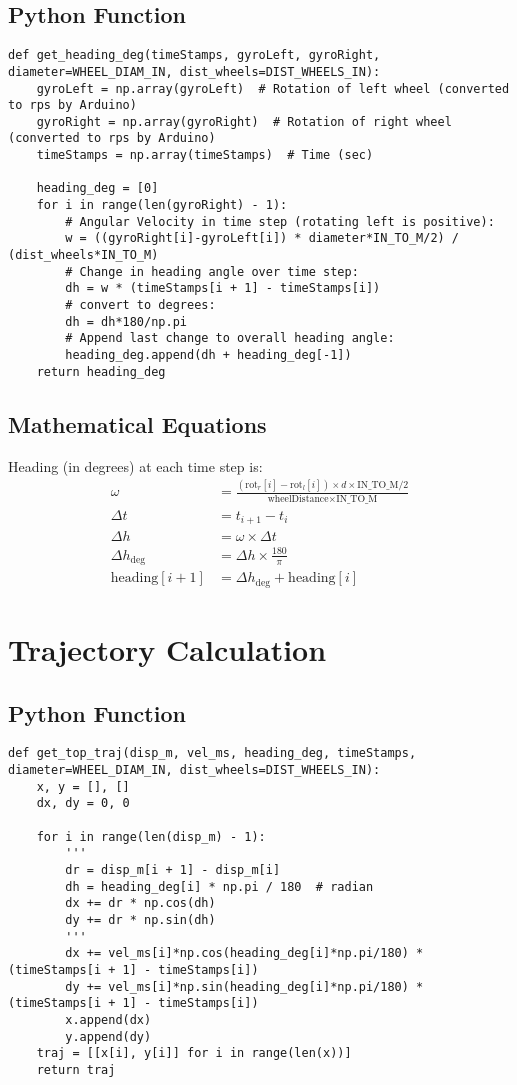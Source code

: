 \documentclass{article}
\begin{document}
\subsection{Python Function}
\begin{lstlisting}
def get_heading_deg(timeStamps, gyroLeft, gyroRight, diameter=WHEEL_DIAM_IN, dist_wheels=DIST_WHEELS_IN):
    gyroLeft = np.array(gyroLeft)  # Rotation of left wheel (converted to rps by Arduino)
    gyroRight = np.array(gyroRight)  # Rotation of right wheel (converted to rps by Arduino)
    timeStamps = np.array(timeStamps)  # Time (sec)

    heading_deg = [0]
    for i in range(len(gyroRight) - 1):
        # Angular Velocity in time step (rotating left is positive):
        w = ((gyroRight[i]-gyroLeft[i]) * diameter*IN_TO_M/2) / (dist_wheels*IN_TO_M)
        # Change in heading angle over time step:
        dh = w * (timeStamps[i + 1] - timeStamps[i])
        # convert to degrees:
        dh = dh*180/np.pi
        # Append last change to overall heading angle:
        heading_deg.append(dh + heading_deg[-1])
    return heading_deg
\end{lstlisting}

\subsection{Mathematical Equations}
Heading (in degrees) at each time step is:
\begin{align*}
\omega &= \frac{(\text{rot}_r[i] - \text{rot}_l[i]) \times d \times \text{IN\_TO\_M} / 2}{\text{wheelDistance} \times \text{IN\_TO\_M}} \\
\Delta t &= t_{i+1} - t_i \\
\Delta h &= \omega \times \Delta t \\
\Delta h_{\text{deg}} &= \Delta h \times \frac{180}{\pi} \\
\text{heading}[i+1] &= \Delta h_{\text{deg}} + \text{heading}[i]
\end{align*}

\section{Trajectory Calculation}

\subsection{Python Function}
\begin{lstlisting}
def get_top_traj(disp_m, vel_ms, heading_deg, timeStamps, diameter=WHEEL_DIAM_IN, dist_wheels=DIST_WHEELS_IN):
    x, y = [], []
    dx, dy = 0, 0

    for i in range(len(disp_m) - 1):
        '''
        dr = disp_m[i + 1] - disp_m[i]
        dh = heading_deg[i] * np.pi / 180  # radian
        dx += dr * np.cos(dh)
        dy += dr * np.sin(dh)
        '''
        dx += vel_ms[i]*np.cos(heading_deg[i]*np.pi/180) * (timeStamps[i + 1] - timeStamps[i])
        dy += vel_ms[i]*np.sin(heading_deg[i]*np.pi/180) * (timeStamps[i + 1] - timeStamps[i])
        x.append(dx)
        y.append(dy)
    traj = [[x[i], y[i]] for i in range(len(x))]
    return traj
\end{lstlisting}
\end{document}
